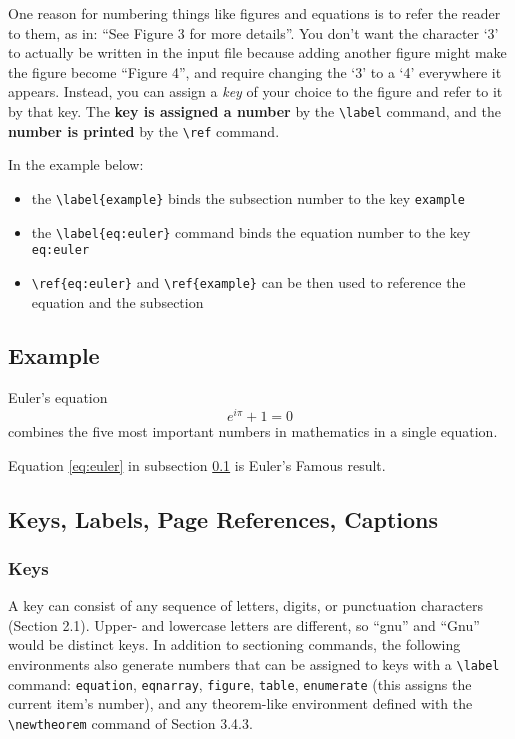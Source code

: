 \documentclass{article}
\newcommand{\justtext}[1]{\texttt{\textbackslash #1}}
\begin{document}
One reason for numbering things like figures and equations is to refer the reader to them, as in:
``See Figure 3 for more details''. You don't want the character `3' to actually be written in the
input file because adding another figure might make the figure become ``Figure 4'', and require
changing the `3' to a `4' everywhere it appears. Instead, you can assign a \emph{key} of your
choice to the figure and refer to it by that key. 
The \textbf{key is assigned a number} by the \justtext{label} command, and 
the \textbf{number is printed} by the \justtext{ref} command.

In the example below:

\begin{itemize}
   \item the \justtext{label\{example\}} binds the subsection number to the key
    {\tt example}
    
   \item the \justtext{label\{eq:euler\}} command binds the equation number to the key
    {\tt eq:euler} 
    
   \item \justtext{ref\{eq:euler\}} and \justtext{ref\{example\}} can be then used to reference the
    equation and the subsection
\end{itemize}

\subsection{Example}\label{example}

Euler's equation
\begin{equation}
   e^{i\pi} + 1 = 0 \label{eq:euler}
\end{equation}
combines the five most important numbers in mathematics in a single equation.

Equation \ref{eq:euler} in subsection \ref{example} is Euler's Famous result. 

\subsection{Keys, Labels, Page References, Captions}

\subsubsection{Keys}

A key can consist of any sequence of letters, digits, or punctuation characters (Section 2.1). 
Upper- and lowercase letters are different, so ``gnu'' and ``Gnu'' would be distinct keys. In
addition to sectioning commands, the following environments also generate numbers that can be
assigned to keys with a \justtext{label} command: 
{\tt equation}, 
{\tt eqnarray},
{\tt figure}, 
{\tt table}, 
{\tt enumerate} (this assigns the current item's number), 
and any theorem-like environment defined with the \justtext{newtheorem} command of Section 3.4.3.
\end{document}
